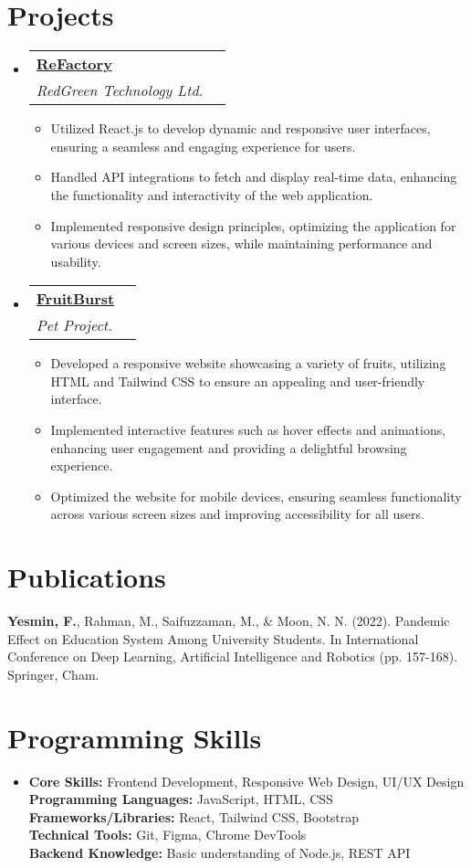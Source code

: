 \documentclass[a4paper,11pt]{article}
\makeatletter
\newcommand{\resumeItem}[1]{\item[$\bullet$] \small{#1 \vspace{-2pt}}}
\newcommand{\resumeSubHeadingListStart}{\begin{itemize}[leftmargin=0pt, label={}]}
\newcommand{\resumeSubHeadingListEnd}{\end{itemize}}
\newcommand{\resumeItemListStart}{\begin{itemize}}
\newcommand{\resumeItemListEnd}{\end{itemize}\vspace{-5pt}}
\newcommand{\resumeSubheading}[5]{
    \vspace{-1pt}\item
    \begin{tabular*}{1\textwidth}{l@{\extracolsep{\fill}}r}
    \textbf{\href{#4}{#1}} & #2 \\
    \textit{\small#3} & \textit{\small #5} \\
    \end{tabular*}\vspace{-5pt}
}
\makeatother
\begin{document}
\section{Projects}
\resumeSubHeadingListStart
\resumeSubheading
{ReFactory}{}
{RedGreen Technology Ltd.}{https://www.refactory.ae/}{}
\resumeItemListStart
\resumeItem{Utilized React.js to develop dynamic and responsive user interfaces, ensuring a seamless and engaging experience for users.}
\resumeItem{Handled API integrations to fetch and display real-time data, enhancing the functionality and interactivity of the web application.}
\resumeItem{Implemented responsive design principles, optimizing the application for various devices and screen sizes, while maintaining performance and usability.}
\resumeItemListEnd
\resumeSubheading
{FruitBurst}{}
{Pet Project.}{https://farzanayesminn.github.io/FruitBrust_HTML-TailwindCSS_Responsive/}{}
\resumeItemListStart
\resumeItem{Developed a responsive website showcasing a variety of fruits, utilizing HTML and Tailwind CSS to ensure an appealing and user-friendly interface.}
\resumeItem{Implemented interactive features such as hover effects and animations, enhancing user engagement and providing a delightful browsing experience.}
\resumeItem{Optimized the website for mobile devices, ensuring seamless functionality across various screen sizes and improving accessibility for all users.}
\resumeItemListEnd
\resumeSubHeadingListEnd

\section{Publications}
\textbf{Yesmin, F.}, Rahman, M., Saifuzzaman, M., \& Moon, N. N. (2022). Pandemic Effect on Education System Among University Students. In International Conference on Deep Learning, Artificial Intelligence and Robotics (pp. 157-168). Springer, Cham.

\section{Programming Skills}
\resumeSubHeadingListStart
\item{
      \textbf{Core Skills:} Frontend Development, Responsive Web Design, UI/UX Design \\
      \textbf{Programming Languages:} JavaScript, HTML, CSS \\
      \textbf{Frameworks/Libraries:} React, Tailwind CSS, Bootstrap \\
      \textbf{Technical Tools:} Git, Figma, Chrome DevTools \\
      \textbf{Backend Knowledge:} Basic understanding of Node.js, REST API
}
\resumeSubHeadingListEnd
\end{document}

